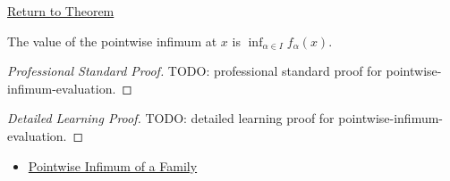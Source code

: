 \newpage
{}
\label{prf:pointwise-infimum-evaluation}

\begin{remark*}[Return]
\hyperref[thm:pointwise-infimum-evaluation]{Return to Theorem}
\end{remark*}

\begin{theorem*}
The value of the pointwise infimum at \(x\) is \(\inf_{\alpha\in I}f_\alpha(x)\).
\end{theorem*}

\begin{proof}[Professional Standard Proof]
\LRAProofBodyStart
TODO: professional standard proof for pointwise-infimum-evaluation.
\end{proof}

\begin{proof}[Detailed Learning Proof]
\LRAProofBodyStart
TODO: detailed learning proof for pointwise-infimum-evaluation.
\end{proof}

\begin{remark*}
\end{remark*}

\begin{dependencies}
\begin{itemize}
  \item \hyperref[def:pointwise-infimum-family]{Pointwise Infimum of a Family}
\end{itemize}
\end{dependencies}

\clearpage
